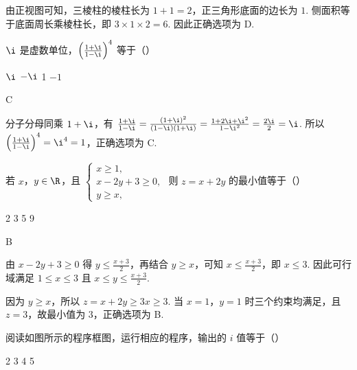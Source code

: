 \begin{solution}
由正视图可知，三棱柱的棱柱长为 \(1+1=2\)，正三角形底面的边长为 \(1\). 侧面积等于底面周长乘棱柱长，即
\(3\times1\times2=6\). 因此正确选项为 D.
\end{solution}

\begin{problem}
\( \i \) 是虚数单位，\( \left(\frac{1+\i}{1-\i}\right)^{4} \) 等于（\quad）

\choices
    {\(\i\)}
    {\(-\i\)}
    {1}
    {\(-1\)}
\end{problem}

\begin{answer}
C
\end{answer}

\begin{solution}
分子分母同乘 \(1+\i\)，有
\(\frac{1+\i}{1-\i}=\frac{(1+\i)^2}{(1-\i)(1+\i)}=\frac{1+2\i+\i^2}{1-\i^2}=\frac{2\i}{2}=\i\). 所以
\(\left(\frac{1+\i}{1-\i}\right)^4=\i^4=1\)，正确选项为 C.
\end{solution}

\begin{problem}
若 \(x\)，\(y \in \R\)，且 \(\begin{cases}
x \geqslant 1,\\
x - 2y + 3 \geqslant 0,\\
y \geqslant x,
\end{cases}\) 则 \(z = x + 2y\) 的最小值等于（\quad）

\choices
    {2}
    {3}
    {5}
    {9}
\end{problem}

\begin{answer}
B
\end{answer}

\begin{solution}
由 \(x-2y+3\geqslant0\) 得 \(y\leqslant\frac{x+3}{2}\)，再结合 \(y\geqslant x\)，可知
\(x\leqslant\frac{x+3}{2}\)，即 \(x\leqslant3\). 因此可行域满足 \(1\leqslant x\leqslant3\) 且 \(x\leqslant y\leqslant\frac{x+3}{2}\).

因为 \(y\geqslant x\)，所以 \(z=x+2y\geqslant3x\geqslant3\). 当 \(x=1\)，\(y=1\) 时三个约束均满足，且 \(z=3\)，故最小值为 \(3\)，正确选项为 B.
\end{solution}

\begin{problem}
阅读如图所示的程序框图，运行相应的程序，输出的 \(i\) 值等于（\quad）


\choices
    {2}
    {3}
    {4}
    {5}
\end{problem}

